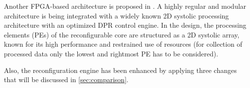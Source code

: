 
Another FPGA-based architecture is proposed in \cite{dpr}. A highly regular and modular architecture is being integrated with a widely known 2D systolic processing architecture with an optimized DPR control engine. In the design, the processing elements (PEs) of the reconfigurable core are structured as a 2D systolic array, known for its high performance and restrained use of resources (for collection of processed data only the lowest and rightmost PE has to be considered).

Also, the reconfiguration engine has been enhanced by applying three changes that will be discussed in \ref{sec:comparison}.
